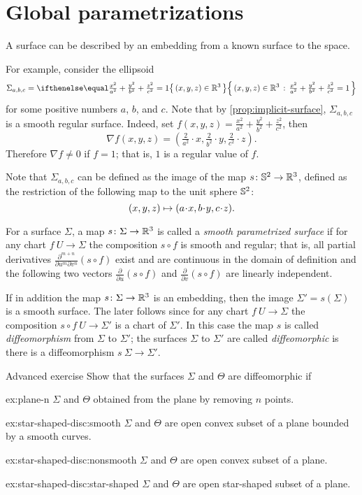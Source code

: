 \section{Global parametrizations} 
A surface can be described by an embedding from a known surface to the space.

For example, consider the ellipsoid
\[\Sigma_{a,b,c}=\set{(x,y,z)\in\RR^3}{\tfrac{x^2}{a^2}+\tfrac{y^2}{b^2}+\tfrac{z^2}{c^2}=1}\]
for some positive numbers $a$, $b$, and $c$.
Note that by \ref{prop:implicit-surface}, $\Sigma_{a,b,c}$ is a smooth regular surface.
Indeed, set $f(x,y,z)=\tfrac{x^2}{a^2}+\tfrac{y^2}{b^2}+\tfrac{z^2}{c^2}$,
then
\[\nabla f(x,y,z)=(\tfrac{2}{a^2}\cdot x,\tfrac{2}{b^2}\cdot y,\tfrac{2}{c^2}\cdot z).\]
Therefore $\nabla f\ne0$ if $f=1$; that is, $1$ is a regular value of $f$.

Note that $\Sigma_{a,b,c}$ can be defined as the image of the map $s\colon\mathbb{S}^2\to\mathbb{R}^3$, defined as the restriction of the following map to the unit sphere $\mathbb{S}^2$:
\[(x,y,z)\z\mapsto (a\cdot x, b\cdot y,c\cdot z).\]

For a surface $\Sigma$, a map $s\colon \Sigma \to \mathbb{R} ^3$ is called a 
\emph{smooth parametrized surface} if for any chart $f\:U\to \Sigma$ 
the composition $s\circ f$ is smooth and regular;
that is, all partial derivatives $\frac{\partial^{m+n}}{\partial u^m\partial v^n}(s\circ f)$ exist and are continuous in the domain of definition and the following two vectors 
$\frac{\partial}{\partial u}(s\circ f)$ and $\frac{\partial}{\partial v}(s\circ f)$ are linearly independent.

If in addition the map $s\colon \Sigma \to \mathbb{R} ^3$ is an embedding, then the image $\Sigma'=s(\Sigma)$ is a smooth surface.
The later follows since for any chart $f\:U\to \Sigma$ the composition $s\circ f\:U\to \Sigma'$ is a chart of $\Sigma'$. 
In this case the map $s$ is called \emph{diffeomorphism} from $\Sigma$ to $\Sigma'$; the surfaces $\Sigma$ to $\Sigma'$ are called {}\emph{diffeomorphic} is there is a diffeomorphism $s\:\Sigma\to\Sigma'$.


\begin{thm}{Advanced exercise}\label{ex:star-shaped-disc}
Show that the surfaces $\Sigma$ and $\Theta$ are diffeomorphic if

\begin{subthm}{ex:plane-n}
$\Sigma$ and $\Theta$ obtained from the plane by removing $n$ points.
\end{subthm}


\begin{subthm}{ex:star-shaped-disc:smooth}
$\Sigma$ and $\Theta$ are open convex subset of a plane bounded by a smooth curves.
\end{subthm}


\begin{subthm}{ex:star-shaped-disc:nonsmooth}
$\Sigma$ and $\Theta$ are open convex subset of a plane.
\end{subthm}

\begin{subthm}{ex:star-shaped-disc:star-shaped}
$\Sigma$ and $\Theta$ are open star-shaped subset of a plane.
\end{subthm}
\end{thm}

